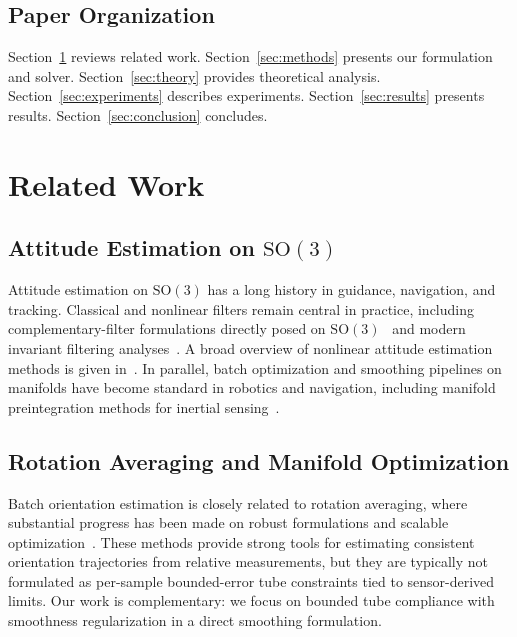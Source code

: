 \documentclass[letterpaper, 10 pt, conference]{ieeeconf}
\newcommand{\SO}{\mathrm{SO}(3)}
\begin{document}
\subsection{Paper Organization}

Section~\ref{sec:related} reviews related work. Section~\ref{sec:methods} presents our formulation and solver. Section~\ref{sec:theory} provides theoretical analysis. Section~\ref{sec:experiments} describes experiments. Section~\ref{sec:results} presents results. Section~\ref{sec:conclusion} concludes.

\section{Related Work}
\label{sec:related}

\subsection{Attitude Estimation on $\SO$}

Attitude estimation on $\SO$ has a long history in guidance, navigation, and tracking. Classical and nonlinear filters remain central in practice, including complementary-filter formulations directly posed on $\SO$~\cite{mahony2008} and modern invariant filtering analyses~\cite{barrau2017}. A broad overview of nonlinear attitude estimation methods is given in~\cite{crassidis2007}. In parallel, batch optimization and smoothing pipelines on manifolds have become standard in robotics and navigation, including manifold preintegration methods for inertial sensing~\cite{forster2015}.

\subsection{Rotation Averaging and Manifold Optimization}

Batch orientation estimation is closely related to rotation averaging, where substantial progress has been made on robust formulations and scalable optimization~\cite{hartley2013,dellaert2020}. These methods provide strong tools for estimating consistent orientation trajectories from relative measurements, but they are typically not formulated as per-sample bounded-error tube constraints tied to sensor-derived limits. Our work is complementary: we focus on bounded tube compliance with smoothness regularization in a direct smoothing formulation.
\end{document}
